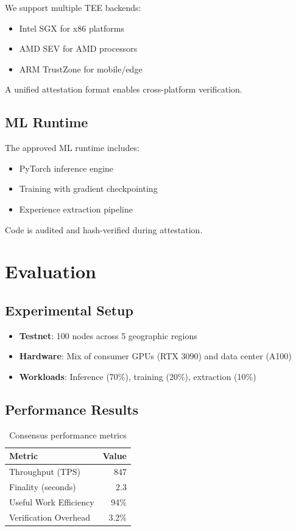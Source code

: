 \documentclass[11pt,letterpaper]{article}
\begin{document}
We support multiple TEE backends:
\begin{itemize}
    \item Intel SGX for x86 platforms
    \item AMD SEV for AMD processors
    \item ARM TrustZone for mobile/edge
\end{itemize}

A unified attestation format enables cross-platform verification.

\subsection{ML Runtime}

The approved ML runtime includes:
\begin{itemize}
    \item PyTorch inference engine
    \item Training with gradient checkpointing
    \item Experience extraction pipeline
\end{itemize}

Code is audited and hash-verified during attestation.

\section{Evaluation}
\label{sec:evaluation}

\subsection{Experimental Setup}

\begin{itemize}
    \item \textbf{Testnet}: 100 nodes across 5 geographic regions
    \item \textbf{Hardware}: Mix of consumer GPUs (RTX 3090) and data center (A100)
    \item \textbf{Workloads}: Inference (70\%), training (20\%), extraction (10\%)
\end{itemize}

\subsection{Performance Results}

\begin{table}[h]
\centering
\caption{Consensus performance metrics}
\label{tab:performance}
\begin{tabular}{lr}
\toprule
\textbf{Metric} & \textbf{Value} \\
\midrule
Throughput (TPS) & 847 \\
Finality (seconds) & 2.3 \\
Useful Work Efficiency & 94\% \\
Verification Overhead & 3.2\% \\
\bottomrule
\end{tabular}
\end{table}
\end{document}
